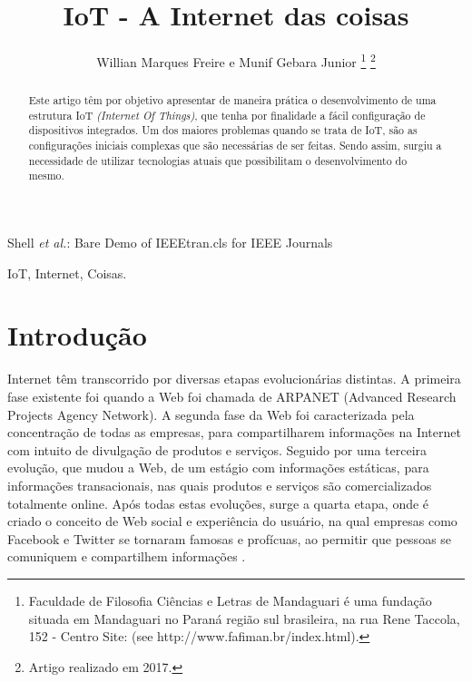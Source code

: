 \documentclass[journal]{IEEEtran}
\begin{document}
\title{IoT - A Internet das coisas}


\author{Willian Marques Freire e
        Munif Gebara Junior%
\thanks{Faculdade de Filosofia Ciências e Letras de Mandaguari é uma fundação
situada em Mandaguari no Paraná região sul brasileira,
na rua Rene Taccola, 152 - Centro Site: (see http://www.fafiman.br/index.html).}%
\thanks{Artigo realizado em 2017.}}



%
{Shell \MakeLowercase{\textit{et al.}}: Bare Demo of IEEEtran.cls for IEEE Journals}

\maketitle

\begin{abstract}
Este artigo têm por objetivo apresentar de maneira prática o desenvolvimento de uma estrutura IoT \emph{(Internet Of Things)}, que tenha por finalidade a fácil configuração de dispositivos integrados. Um dos maiores problemas quando se trata de IoT, são as configurações iniciais complexas que são necessárias de ser feitas. Sendo assim, surgiu a necessidade de utilizar tecnologias atuais que possibilitam o desenvolvimento do mesmo. 
\end{abstract}

\begin{IEEEkeywords}
IoT, Internet, Coisas.
\end{IEEEkeywords}




\IEEEpeerreviewmaketitle



\section{Introdução}

 Internet têm transcorrido por diversas etapas evolucionárias distintas. A primeira fase existente foi quando a Web foi chamada de ARPANET (Advanced Research Projects Agency Network). A segunda fase da Web foi caracterizada pela concentração de todas as empresas, para compartilharem informações na Internet com intuito de divulgação de produtos e serviços. Seguido por uma terceira evolução, que mudou a Web, de um estágio com informações estáticas, para informações transacionais, nas quais produtos e serviços são comercializados totalmente online. Após todas estas evoluções, surge a quarta etapa, onde é criado o conceito de Web social e experiência do usuário, na qual empresas como Facebook e Twitter se tornaram famosas e profícuas, ao permitir que pessoas se comuniquem e compartilhem informações \cite[p.~6]{Evans}.
\end{document}
